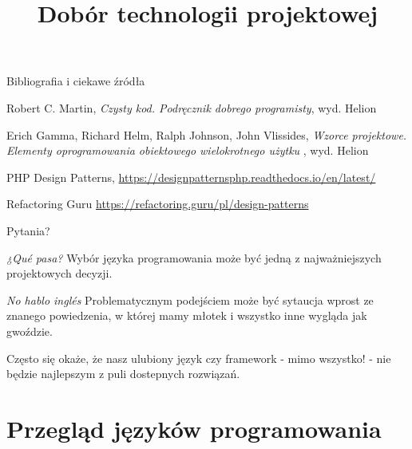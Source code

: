 \begin{frame}{Bibliografia i ciekawe źródła}
  
	\begin{thebibliography}{9}
	
		Robert C. Martin,
		\textit{Czysty kod. Podręcznik dobrego programisty},
		wyd. Helion
	
		 Erich Gamma, Richard Helm, Ralph Johnson, John Vlissides,
		\textit{Wzorce projektowe. Elementy oprogramowania obiektowego wielokrotnego użytku },
		wyd. Helion
		
		PHP Design Patterns,
		\url{https://designpatternsphp.readthedocs.io/en/latest/}
		
		Refactoring Guru
		\url{https://refactoring.guru/pl/design-patterns}
	
	\end{thebibliography}

\end{frame}

\begin{frame}[standout]
	Pytania?
\end{frame}










\title{Dobór technologii projektowej}
\maketitle

\begin{frame}{\emph{¿Qué pasa?}}		
	Wybór języka programowania może być jedną z najważniejszych projektowych decyzji.
\end{frame}

\begin{frame}{\emph{No hablo inglés}}		
	Problematycznym podejściem może być sytaucja wprost ze znanego powiedzenia, w której mamy młotek i wszystko inne wygląda jak gwoździe.
	
	Często się okaże, że nasz ulubiony język czy framework - mimo wszystko! - nie będzie najlepszym z puli dostepnych rozwiązań.
\end{frame}

\section{Przegląd języków programowania}

